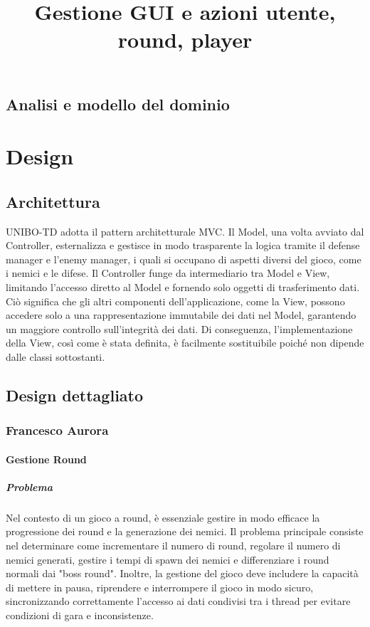 \documentclass[a4paper,12pt]{report}
\begin{document}
\section{Analisi e modello del dominio}



\chapter{Design}

\section{Architettura}

UNIBO-TD adotta il pattern architetturale MVC. Il Model, una volta avviato dal Controller, esternalizza e gestisce in modo trasparente la logica tramite il defense manager e l'enemy manager, i quali si occupano di aspetti diversi del gioco, come i nemici e le difese. Il Controller funge da intermediario tra Model e View, limitando l'accesso diretto al Model e fornendo solo oggetti di trasferimento dati. Ciò significa che gli altri componenti dell'applicazione, come la View, possono accedere solo a una rappresentazione immutabile dei dati nel Model, garantendo un maggiore controllo sull'integrità dei dati. Di conseguenza, l'implementazione della View, così come è stata definita, è facilmente sostituibile poiché non dipende dalle classi sottostanti.





\section{Design dettagliato}
\subsection{Francesco Aurora}
\title{\textbf{Gestione GUI e azioni utente, round, player}}
\subsubsection{Gestione Round}

\paragraph{Problema} Nel contesto di un gioco a round, è essenziale gestire in modo efficace la progressione dei round e la generazione dei nemici. Il problema principale consiste nel determinare come incrementare il numero di round, regolare il numero di nemici generati, gestire i tempi di spawn dei nemici e differenziare i round normali dai "boss round". Inoltre, la gestione del gioco deve includere la capacità di mettere in pausa, riprendere e interrompere il gioco in modo sicuro, sincronizzando correttamente l'accesso ai dati condivisi tra i thread per evitare condizioni di gara e inconsistenze.
\end{document}
